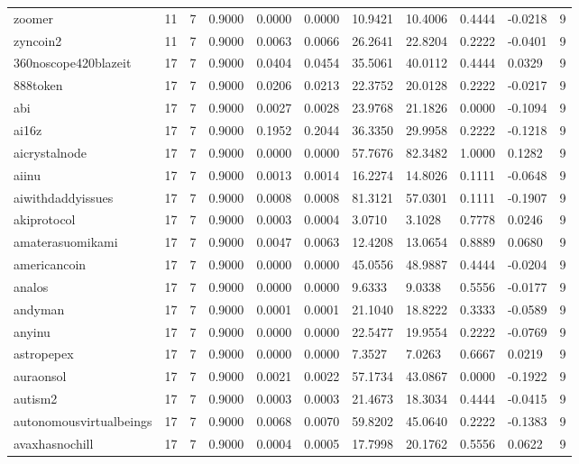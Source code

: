 \begin{table}[htbp]
\begin{tabular}{lllllllllll}
zoomer & 11 & 7 & 0.9000 & 0.0000 & 0.0000 & 10.9421 & 10.4006 & 0.4444 & -0.0218 & 9 \\
zyncoin2 & 11 & 7 & 0.9000 & 0.0063 & 0.0066 & 26.2641 & 22.8204 & 0.2222 & -0.0401 & 9 \\
360noscope420blazeit & 17 & 7 & 0.9000 & 0.0404 & 0.0454 & 35.5061 & 40.0112 & 0.4444 & 0.0329 & 9 \\
888token & 17 & 7 & 0.9000 & 0.0206 & 0.0213 & 22.3752 & 20.0128 & 0.2222 & -0.0217 & 9 \\
abi & 17 & 7 & 0.9000 & 0.0027 & 0.0028 & 23.9768 & 21.1826 & 0.0000 & -0.1094 & 9 \\
ai16z & 17 & 7 & 0.9000 & 0.1952 & 0.2044 & 36.3350 & 29.9958 & 0.2222 & -0.1218 & 9 \\
aicrystalnode & 17 & 7 & 0.9000 & 0.0000 & 0.0000 & 57.7676 & 82.3482 & 1.0000 & 0.1282 & 9 \\
aiinu & 17 & 7 & 0.9000 & 0.0013 & 0.0014 & 16.2274 & 14.8026 & 0.1111 & -0.0648 & 9 \\
aiwithdaddyissues & 17 & 7 & 0.9000 & 0.0008 & 0.0008 & 81.3121 & 57.0301 & 0.1111 & -0.1907 & 9 \\
akiprotocol & 17 & 7 & 0.9000 & 0.0003 & 0.0004 & 3.0710 & 3.1028 & 0.7778 & 0.0246 & 9 \\
amaterasuomikami & 17 & 7 & 0.9000 & 0.0047 & 0.0063 & 12.4208 & 13.0654 & 0.8889 & 0.0680 & 9 \\
americancoin & 17 & 7 & 0.9000 & 0.0000 & 0.0000 & 45.0556 & 48.9887 & 0.4444 & -0.0204 & 9 \\
analos & 17 & 7 & 0.9000 & 0.0000 & 0.0000 & 9.6333 & 9.0338 & 0.5556 & -0.0177 & 9 \\
andyman & 17 & 7 & 0.9000 & 0.0001 & 0.0001 & 21.1040 & 18.8222 & 0.3333 & -0.0589 & 9 \\
anyinu & 17 & 7 & 0.9000 & 0.0000 & 0.0000 & 22.5477 & 19.9554 & 0.2222 & -0.0769 & 9 \\
astropepex & 17 & 7 & 0.9000 & 0.0000 & 0.0000 & 7.3527 & 7.0263 & 0.6667 & 0.0219 & 9 \\
auraonsol & 17 & 7 & 0.9000 & 0.0021 & 0.0022 & 57.1734 & 43.0867 & 0.0000 & -0.1922 & 9 \\
autism2 & 17 & 7 & 0.9000 & 0.0003 & 0.0003 & 21.4673 & 18.3034 & 0.4444 & -0.0415 & 9 \\
autonomousvirtualbeings & 17 & 7 & 0.9000 & 0.0068 & 0.0070 & 59.8202 & 45.0640 & 0.2222 & -0.1383 & 9 \\
avaxhasnochill & 17 & 7 & 0.9000 & 0.0004 & 0.0005 & 17.7998 & 20.1762 & 0.5556 & 0.0622 & 9 \\

\end{tabular}
\end{table}
